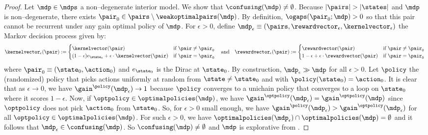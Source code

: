 \documentclass[preprint,cleveref,12pt]{colt2025}
\DeclarePairedDelimiter{\abs}{\lvert}{\rvert}	%
\def\model{\mdp}
\def\models{\mdps}
\def\kernel{\kernelvector}
\def\reward{\rewardvector}
\def\optpolicies{\optimalpolicies}
\def\wkoptpairs{\weakoptimalpairs}
\begin{document}
    \begin{proof}
        Let $\model \in \models$ a non--degenerate interior model. 
        We show that $\confusing(\model) \ne \emptyset$.
        Because $\abs{\pairs} > \abs{\states}$ and $\model$ is non--degenerate, there exists $\pair_0 \in \pairs \setminus \wkoptpairs(\model)$. 
        By definition, $\ogaps(\pair_0; \model) > 0$ so that this pair cannot be recurrent under any gain optimal policy of $\model$. 
        For $\epsilon > 0$, define $\model_\epsilon \equiv (\pairs, \reward_\epsilon, \kernel_\epsilon)$ the Markov decision process given by:
        \begin{equation*}
            \kernel_\epsilon (\pair)
            := 
            \begin{cases}
                \kernel(\pair) & \text{if~} \pair \ne \pair_0
                \\
                (1 - \epsilon) e_{\state_0} + \epsilon \cdot \kernel(\pair) & \text{if~} \pair = \pair_0
            \end{cases}
            \text{~~~and~~~}
            \reward_\epsilon (\pair)
            := 
            \begin{cases}
                \reward(\pair) & \text{if~} \pair \ne \pair_0
                \\
                1 - \epsilon + \epsilon \cdot \reward(\pair) & \text{if~} \pair = \pair_0
            \end{cases}
        \end{equation*}
        where $\pair_0 \equiv (\state_0, \action_0)$ and $e_{\state_0}$ is the Dirac at $\state_0$.
        By construction, $\model_\epsilon \gg \model$ for all $\epsilon > 0$. 
        Let $\policy$ the (randomized) policy that picks actions uniformly at random from $\state \ne \state_0$ and with $\policy(\state_0) = \action_0$. 
        It is clear that as $\epsilon \to 0$, we have $\gain^\policy(\model_\epsilon) \to 1$ because $\policy$ converges to a unichain policy that converges to a loop on $\state_0$ where it scores $1 - \epsilon$. 
        Now, if $\optpolicy \in \optpolicies(\model)$, we have $\gain^{\optpolicy}(\model_\epsilon) = \gain^{\optpolicy}(\model)$ since $\optpolicy$ does not pick $\action_0$ from $\state_0$. 
        So, for $\epsilon > 0$ small enough, we have $\gain^{\policy}(\model_\epsilon) > \gain^{\optpolicy}(\model_\epsilon)$ for all $\optpolicy \in \optpolicies(\model)$.
        For such $\epsilon > 0$, we have $\optpolicies(\model_\epsilon) \cap \optpolicies(\model) = \emptyset$ and it follows that $\model_\epsilon \in \confusing(\model)$. 
        So $\confusing(\model) \ne \emptyset$ and $\model$ is explorative from .
    \end{proof}
\end{document}
